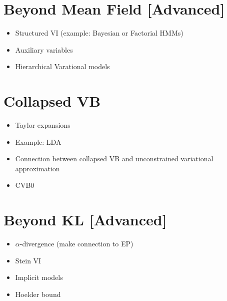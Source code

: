 \documentclass[11pt, a4paper]{article}
\begin{document}
\section{Beyond Mean Field [Advanced]}
\begin{itemize}
\item Structured VI (example: Bayesian or Factorial HMMs)
\item Auxiliary variables
\item Hierarchical Varational models 
\end{itemize}

\section{Collapsed VB}
\begin{itemize}
\item Taylor expansions
\item Example: LDA
\item Connection between collapsed VB and unconstrained variational approximation \citep{TehEtAl:2007}
\item CVB0 \citep{AsuncionEtAl:2009}
\end{itemize}

\section{Beyond KL [Advanced]}
\begin{itemize}
\item $ \alpha $-divergence (make connection to EP)
\item Stein VI
\item Implicit models
\item Hoelder bound
\end{itemize}



\end{document}

